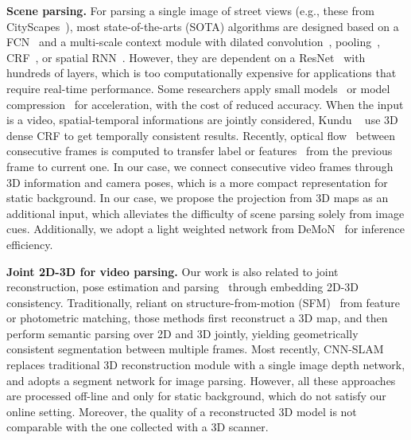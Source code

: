 \textbf{Scene parsing.} For parsing a single image of street views (e.g., these from CityScapes~\cite{Cordts2016Cityscapes}), most state-of-the-arts (SOTA) algorithms are designed based on a FCN~\cite{WuSH16e} and a multi-scale context module with dilated convolution~\cite{ChenPSA17}, pooling~\cite{ZhaoSQWJ16}, CRF~\cite{higherordercrf_ECCV2016}, or spatial RNN~\cite{byeon2015scene}. However, they are dependent on a ResNet~\cite{HeZRS15} with hundreds of layers, which is too computationally expensive for applications that require real-time performance. 
Some researchers apply small models~\cite{PaszkeCKC16} or model compression~\cite{ZhaoQSSJ17} for acceleration, with the cost of reduced accuracy.
When the input is a video, spatial-temporal informations are jointly considered, Kundu \etal~\cite{kundu2016feature} use 3D dense CRF to get temporally consistent results. Recently, optical flow~\cite{dosovitskiy2015flownet} between consecutive frames is computed to transfer label or features~\cite{gadde2017semantic,zhu2016deep} from the previous frame to current one.  In our case, we connect consecutive video frames through 3D information and camera poses, which is a more compact representation for static background. 
In our case, we propose the projection from 3D maps as an additional input, which alleviates the difficulty of scene parsing solely from image cues. Additionally, we adopt a light weighted network from DeMoN~\cite{ummenhofer2016demon} for inference efficiency.%

\textbf{Joint 2D-3D for video parsing.} Our work is also related to joint reconstruction, pose estimation and parsing~\cite{kundu2014joint,hane2013joint} through embedding 2D-3D consistency.
 Traditionally, reliant on structure-from-motion (SFM)~\cite{hane2013joint} from feature or photometric matching, those methods first reconstruct a 3D map, and then perform semantic parsing over 2D and 3D jointly, yielding geometrically consistent segmentation between multiple frames.
 Most recently, CNN-SLAM~\cite{tateno2017cnn} replaces traditional 3D reconstruction module with a single image depth network, and adopts a segment network for image parsing.
 However, all these approaches are processed off-line and only for static background, which do not satisfy our online setting. Moreover, the quality of a reconstructed 3D model is not comparable with the one collected with a 3D scanner. %

